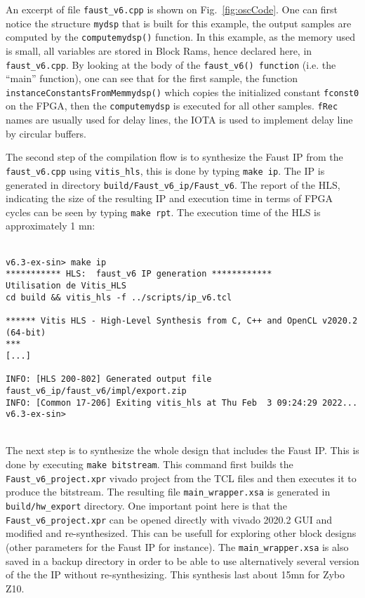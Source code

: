 An excerpt of file {\tt faust\_v6.cpp} is shown on Fig.~\ref{fig:oscCode}. One can first notice the structure {\tt mydsp} that is built for this example, the output  samples are computed by the {\tt computemydsp()} function. In this example, as the memory used is small, all variables are stored in Block Rams, hence declared here, in {\tt faust\_v6.cpp}. By looking at the body of the {\tt faust\_v6() function} (i.e. the ``main'' function),  one can see that for the first sample, the function {\tt instanceConstantsFromMemmydsp()} which copies the initialized constant {\tt fconst0} on the FPGA, then the {\tt computemydsp} is executed for all other samples. {\tt fRec} names are usually used for delay lines, the IOTA is used to implement delay line by circular buffers.

The second step of the compilation flow is to synthesize the Faust IP from the {\tt faust\_v6.cpp} using {\tt vitis\_hls}, this is done by typing {\tt make ip}.
The IP is generated in directory {\tt build/Faust\_v6\_ip/Faust\_v6}. The report of the HLS, indicating the size of the resulting IP and execution time in terms of FPGA cycles can be seen by typing {\tt make rpt}.
The execution time of the HLS is approximately 1 mn:\\
~\\
\begin{boxedminipage}{\textwidth}
  \small
\begin{verbatim}
v6.3-ex-sin> make ip
*********** HLS:  faust_v6 IP generation ************
Utilisation de Vitis_HLS
cd build && vitis_hls -f ../scripts/ip_v6.tcl

****** Vitis HLS - High-Level Synthesis from C, C++ and OpenCL v2020.2 (64-bit)
***
[...]

INFO: [HLS 200-802] Generated output file faust_v6_ip/faust_v6/impl/export.zip
INFO: [Common 17-206] Exiting vitis_hls at Thu Feb  3 09:24:29 2022...
v6.3-ex-sin> 
\end{verbatim}
\end{boxedminipage}
~\\

The next step is to synthesize the whole design that includes the Faust IP. This is done by executing {\tt make bitstream}. This command first builds the {\tt Faust\_v6\_project.xpr} vivado project from the TCL files and then executes it to produce the bitstream. The resulting file {\tt main\_wrapper.xsa} is generated in {\tt build/hw\_export} directory. One important point here is that the {\tt Faust\_v6\_project.xpr} can be opened directly with vivado 2020.2 GUI and modified and re-synthesized. This can be usefull for exploring other block designs (other parameters for the Faust IP for instance). The {\tt main\_wrapper.xsa} is also saved in a backup directory in order to be able to use alternatively several version of the the IP without re-synthesizing. This synthesis last about 15mn for Zybo Z10.\\

